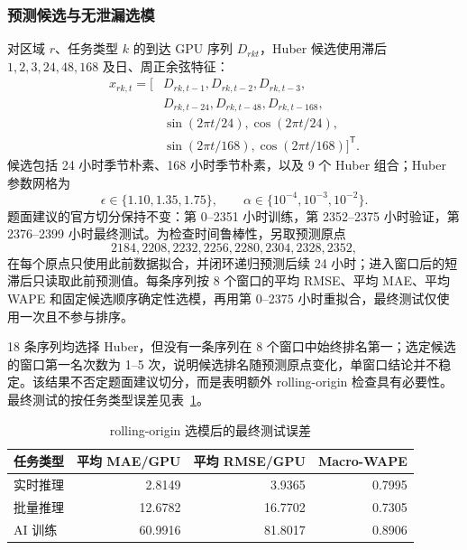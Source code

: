 \subsubsection{预测候选与无泄漏选模}
对区域 $r$、任务类型 $k$ 的到达 GPU 序列 $D_{rkt}$，Huber 候选使用滞后 $1,2,3,24,48,168$ 及日、周正余弦特征：
\begin{equation}
\begin{aligned}
x_{rk,t}=\big[&D_{rk,t-1},D_{rk,t-2},D_{rk,t-3},\\
&D_{rk,t-24},D_{rk,t-48},D_{rk,t-168},\\
&\sin(2\pi t/24),\cos(2\pi t/24),\\
&\sin(2\pi t/168),\cos(2\pi t/168)\big]^{\mathsf T}.
\end{aligned}
\end{equation}
候选包括 24 小时季节朴素、168 小时季节朴素，以及 9 个 Huber 组合；Huber 参数网格为
\[
\epsilon\in\{1.10,1.35,1.75\},\qquad \alpha\in\{10^{-4},10^{-3},10^{-2}\}.
\]
题面建议的官方切分保持不变：第 0--2351 小时训练，第 2352--2375 小时验证，第 2376--2399 小时最终测试。为检查时间鲁棒性，另取预测原点
\[
2184,2208,2232,2256,2280,2304,2328,2352,
\]
在每个原点只使用此前数据拟合，并闭环递归预测后续 24 小时；进入窗口后的短滞后只读取此前预测值。每条序列按 8 个窗口的平均 RMSE、平均 MAE、平均 WAPE 和固定候选顺序确定性选模，再用第 0--2375 小时重拟合，最终测试仅使用一次且不参与排序。

18 条序列均选择 Huber，但没有一条序列在 8 个窗口中始终排名第一；选定候选的窗口第一名次数为 1--5 次，说明候选排名随预测原点变化，单窗口结论并不稳定。该结果不否定题面建议切分，而是表明额外 rolling-origin 检查具有必要性。最终测试的按任务类型误差见表~\ref{tab:q1type}。
\begin{table}[H]\centering
\caption{rolling-origin 选模后的最终测试误差}\label{tab:q1type}
\begin{tabular}{lrrr}\toprule
任务类型 & 平均 MAE/GPU & 平均 RMSE/GPU & Macro-WAPE\\\midrule
实时推理 & 2.8149 & 3.9365 & 0.7995\\
批量推理 & 12.6782 & 16.7702 & 0.7305\\
AI 训练 & 60.9916 & 81.8017 & 0.8906\\\bottomrule
\end{tabular}
\end{table}

